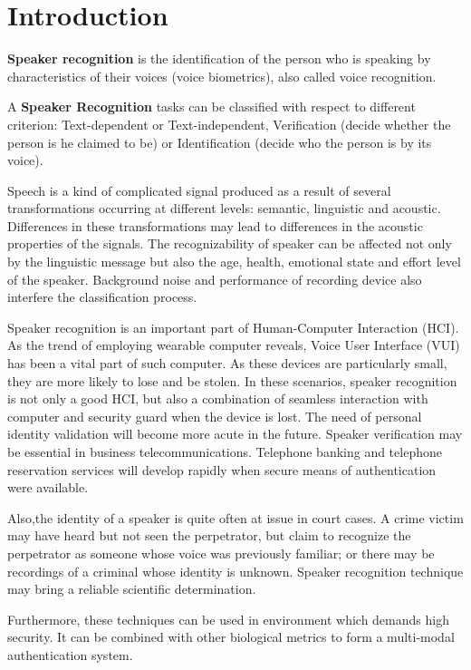 


\section{Introduction}
\textbf{Speaker recognition} is the identification of the person who is speaking by characteristics
of their voices (voice biometrics), also called voice recognition. \cite{SRwiki}

A \textbf{Speaker Recognition} tasks can be classified with respect to different criterion:
Text-dependent or Text-independent, Verification (decide whether the person is he claimed to be) or
Identification (decide who the person is by its voice).\cite{SRwiki}

Speech is a kind of complicated signal produced as a result of several transformations occurring at
different levels: semantic, linguistic and acoustic.
Differences in these transformations may lead to differences in the acoustic properties of the signals.
The recognizability of speaker can be affected not only by the linguistic message
but also the age, health, emotional state and effort level of the speaker.
Background noise and performance of recording device also interfere
the classification process.

Speaker recognition is an important part of Human-Computer Interaction (HCI).
As the trend of employing wearable computer reveals,
Voice User Interface (VUI) has been a vital part of such computer.
As these devices are particularly small, they are more likely to lose and be stolen.
In these scenarios, speaker recognition is not only a good HCI,
but also a combination of seamless interaction with computer and security guard
when the device is lost.
The need of personal identity validation will become more acute in the future.
Speaker verification may be essential in business telecommunications.
Telephone banking and telephone reservation services will develop rapidly
when secure means of authentication were available.

Also,the identity of a speaker is quite often at issue in court cases.
A crime victim may have heard but not seen the perpetrator,
but claim to recognize the perpetrator as someone whose voice was previously familiar;
or there may be recordings of a criminal whose identity is unknown.
Speaker recognition technique may bring a reliable scientific determination.

Furthermore, these techniques can be used in environment which demands high security.
It can be combined with other biological metrics to form a multi-modal authentication system.


